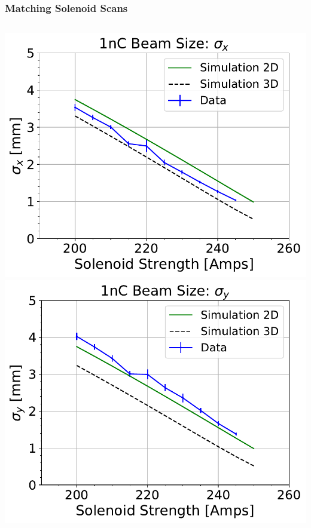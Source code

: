 \documentclass[professionalfonts,t]{beamer}
\begin{document}
{\begin{frame}[t]
\frametitle{Matching Solenoid Scans}
\begin{columns}[T]
\begin{column}{0.76\textwidth}
\begin{minipage}{0.5\textheight}
	\includegraphics[width=1.0\linewidth]{../../tex/images/xbeamsizes_low_charge_sol_scan_11-02-2017}	\includegraphics[width=1.0\linewidth]{../../tex/images/ybeamsizes_low_charge_sol_scan_11-02-2017}
\end{minipage}
\begin{minipage}{0.5\textheight}

\end{minipage}
\end{column}
\end{columns}
\end{frame}}
\end{document}
